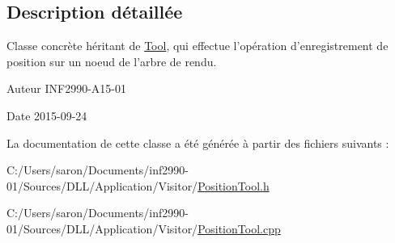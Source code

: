 \subsection{Description détaillée}
Classe concrète héritant de \hyperlink{class_tool}{Tool}, qui effectue l'opération d'enregistrement de position sur un noeud de l'arbre de rendu. 

\begin{DoxyAuthor}{Auteur}
I\-N\-F2990-\/\-A15-\/01 
\end{DoxyAuthor}
\begin{DoxyDate}{Date}
2015-\/09-\/24 
\end{DoxyDate}


La documentation de cette classe a été générée à partir des fichiers suivants \-:\begin{DoxyCompactItemize}
\item 
C\-:/\-Users/saron/\-Documents/inf2990-\/01/\-Sources/\-D\-L\-L/\-Application/\-Visitor/\hyperlink{_position_tool_8h}{Position\-Tool.\-h}\item 
C\-:/\-Users/saron/\-Documents/inf2990-\/01/\-Sources/\-D\-L\-L/\-Application/\-Visitor/\hyperlink{_position_tool_8cpp}{Position\-Tool.\-cpp}\end{DoxyCompactItemize}
